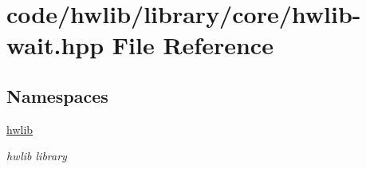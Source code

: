 \hypertarget{hwlib-wait_8hpp}{}\section{code/hwlib/library/core/hwlib-\/wait.hpp File Reference}
\label{hwlib-wait_8hpp}
\subsection*{Namespaces}
\begin{DoxyCompactItemize}
\item 
 \hyperlink{namespacehwlib}{hwlib}
\begin{DoxyCompactList}\small\item\em hwlib library \end{DoxyCompactList}\end{DoxyCompactItemize}
